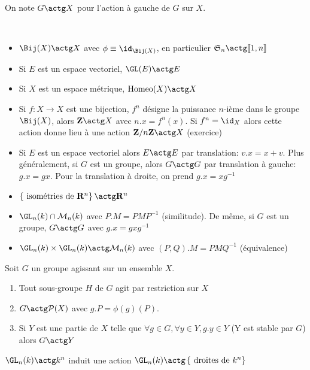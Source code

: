 \begin{dfn}[Notation]
On note $G\actg X$ pour l'action à gauche de  $G$ sur  $X$.
\end{dfn}

\begin{ex}~
\begin{itemize}
    \item $\Bij(X)\actg X$ avec $\phi\equiv \id_{\Bij(X)}$, en particulier  $\gS_n\actg \llbracket 1,n \rrbracket $
    \item Si $E$ est un espace vectoriel,  $\GL(E)\actg E$
    \item Si  $X$ est un espace métrique,  $\mathrm{Homeo}(X)\actg X$
    \item Si $f:X \longrightarrow X$ est une bijection, $f^n$ désigne la puissance $n$-ième dans le groupe  $\Bij(X)$, alors  $\Z\actg X$ avec $n.x=f^n(x)$. Si  $f^n=\id_X$ alors cette action donne lieu à une action  $\Z / n\Z \actg X$ (exercice)
    \item Si $E$ est un espace vectoriel alors  $E\actg E$ par translation:  $v.x=x+v$. Plus généralement, si  $G$ est un groupe, alors  $G\actg G$ par translation à gauche:  $g.x=gx$. Pour la translation à droite, on prend $g.x=xg^{-1}$
    \item $\left\{ \text{ isométries de } \R^n\right\} \actg \R^n$
    \item $\GL_n(k)\cap \mathcal  M_n(k)$ avec $P.M=PMP^{-1}$ (similitude). De même, si $G$ est un groupe,  $G\actg G$ avec $g.x=gxg^{-1}$
    \item $\GL_n(k)\times \GL_n(k)\actg \mathcal M_n(k)$ avec $(P,Q).M=PMQ^{-1}$ (équivalence)
\end{itemize}
\end{ex}

\begin{prop}
Soit $G$ un groupe agissant sur  un ensemble $X$.  \begin{enumerate}
    \item Tout sous-groupe $H$ de $G$ agit par restriction sur $X$
    \item $G\actg \mathcal  P(X)$ avec $g.P=\phi(g)(P)$.
    \item Si  $Y$ est une partie de  $X$ telle que  $\forall g \in  G, \forall  y \in  Y, g.y \in Y$ (Y est stable par $G$) alors $G\actg Y$
\end{enumerate}
\end{prop}

\begin{ex}
    $\GL_n(k)\actg k^n$ induit une action  $\GL_n(k)\actg \left\{ \text{ droites de } k^n\right\} $
\end{ex}

